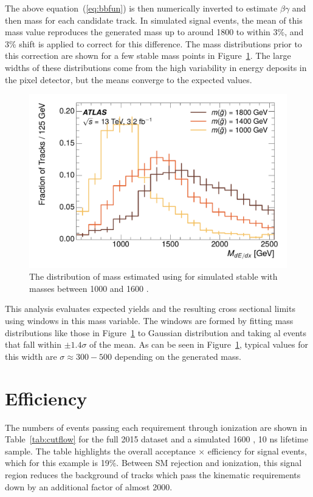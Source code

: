The above equation~(\ref{eq:bbfun}) is then numerically inverted to estimate $\beta\gamma$ and then mass for each candidate track.
In simulated signal events, the mean of this mass value reproduces the generated mass up to around 1800 \GeV to within 3\%, and 3\% shift is applied to correct for this difference.
The mass distributions prior to this correction are shown for a few stable mass points in Figure~\ref{fig:mass_dedx}.
The large widths of these distributions come from the high variability in energy deposits in the pixel detector, but the means converge to the expected values.

\begin{figure}
\centering
\includegraphics[width=\fullfig]{figures/mass_dedx.pdf}
\caption{The distribution of mass estimated using \dedx for simulated stable \rhadrons with masses between 1000 and 1600 \GeV.}
\label{fig:mass_dedx}
\end{figure}

This analysis evaluates expected yields and the resulting cross sectional limits using windows in this mass variable.
The windows are formed by fitting mass distributions like those in Figure~\ref{fig:mass_dedx} to Gaussian distribution and taking al events that fall within $\pm 1.4 \sigma$ of the mean.
As can be seen in Figure~\ref{fig:mass_dedx}, typical values for this width are $\sigma \approx 300-500$ \GeV depending on the generated mass.

\section{Efficiency}

The numbers of events passing each requirement through ionization are shown in Table~\ref{tab:cutflow} for the full 2015 dataset and a simulated 1600 \GeV, 10 ns lifetime \rhadron sample. 
The table highlights the overall acceptance $\times$ efficiency for signal events, which for this example is 19\%.
Between \ac{SM} rejection and ionization, this signal region reduces the background of tracks which pass the kinematic requirements down by an additional factor of almost 2000.

